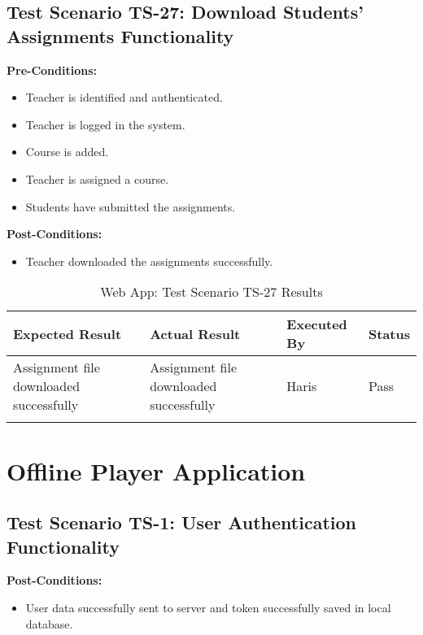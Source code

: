 \subsection{Test Scenario TS-27: Download Students' Assignments Functionality}

\textbf{Pre-Conditions: }
\begin{itemize}

\item Teacher is identified and authenticated.
\item Teacher is logged in the system.
\item Course is added.
\item Teacher is assigned a course.
\item Students have submitted the assignments.

\end{itemize}

\textbf{Post-Conditions: }
\begin{itemize}
\item Teacher downloaded the assignments successfully.

\end{itemize}


\bigskip

\begin{longtable}{|p{4cm}|p{4cm}|p{2cm}|p{2cm}|}
\hline
\textbf{Expected Result} & \textbf{Actual Result} & \textbf{Executed By} & \textbf{Status}\\
\hline
Assignment file downloaded successfully &
Assignment file downloaded successfully &
Haris &
Pass \\
\hline

\caption{Web App: Test Scenario TS-27 Results}
\end{longtable}


\section{Offline Player Application}

\subsection{Test Scenario TS-1: User Authentication Functionality}

\textbf{Post-Conditions: }
\begin{itemize}
\item User data successfully sent to server and token successfully saved in local database.
\end{itemize}

